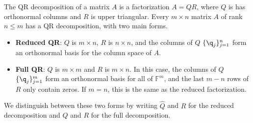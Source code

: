\label{lab:QRdecomp}
\def\lvl#1{\multicolumn{1}{|c}{#1}} %
\def\rvl#1{\multicolumn{1}{c|}{#1}} %

The QR decomposition of a matrix $A$ is a factorization $A=QR$, where $Q$ is  has orthonormal columns and $R$ is upper triangular.
Every $m \times n$ matrix $A$ of rank $n \le m$ has a QR decomposition, with two main forms.
%
\begin{itemize}
    \item \textbf{Reduced QR}: $Q$ is $m \times n$, $R$ is $n \times n$, and the columns of $Q$ $\{\q_j\}_{j=1}^n$ form an orthonormal basis for the column space of $A$.
    \item \textbf{Full QR}: $Q$ is $m \times m$ and $R$ is $m \times n$.
    In this case, the columns of $Q$ $\{\q_j\}_{j=1}^m$ form an orthonormal basis for all of $\mathbb{F}^m$, and the last $m - n$ rows of $R$ only contain zeros.
    If $m = n$, this is the same as the reduced factorization.
\end{itemize}
We distinguish between these two forms by writing $\widehat{Q}$ and $\widehat{R}$ for the reduced decomposition and $Q$ and $R$ for the full decomposition.
%
